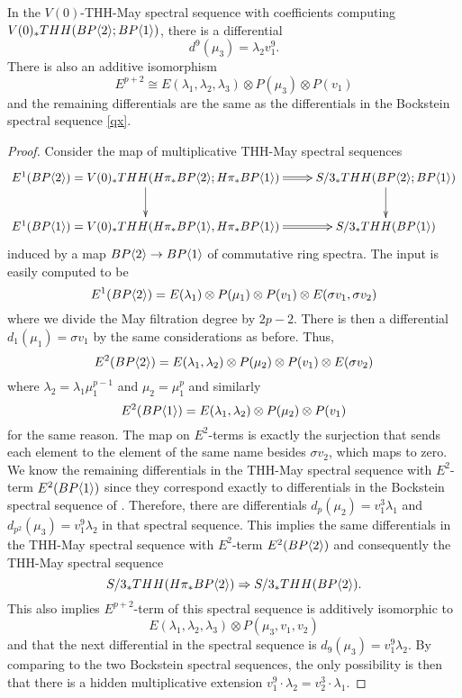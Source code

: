 \begin{lem}
In the $V(0)$-THH-May spectral sequence with coefficients computing $V(0)_*THH(BP\langle 2 \rangle;BP\langle 1 \rangle)$, there is a differential 
\[d^{9}(\mu_3)=\lambda_2v_1^9.\] 
There is also an additive isomorphism 
\[E^{p+2}\cong E(\lambda_1,\lambda_2,\lambda_3)\otimes P(\mu_3)\otimes P(v_1)\]
and the remaining differentials are the same as the differentials in the Bockstein spectral sequence \eqref{qx}.
\end{lem}
\begin{proof}
Consider the map of multiplicative THH-May spectral sequences 
\[ 
\xymatrix{
E^1(\B)=V(0)_*THH(H\pi_*\B;H\pi_*\tBP{1}) \ar[d] \ar@{=>}[r] &  S/3_*THH(\B;\tBP{1}) \ar[d] \\
E^1(\tBP{1})=V(0)_*THH(H\pi_*\tBP{1}, H\pi_*\tBP{1}) \ar@{=>}[r] &  S/3_*THH(\tBP{1})
}
\]
induced by a map $BP\langle 2 \rangle\to BP\langle 1 \rangle$ of commutative ring spectra. 
The input is easily computed to be 
\[ E^1(BP\langle 2 \rangle)=E(\lambda_1)\otimes P(\mu_1)\otimes P(v_1)\otimes E(\sigma v_1,\sigma v_2)\]
where we divide the May filtration degree by $2p-2$. There is then a differential $d_1(\mu_1)=\sigma v_1$ by the same considerations as before. Thus, 
\[ E^2(BP\langle 2 \rangle)=E(\lambda_1,\lambda_2)\otimes P(\mu_2) \otimes P(v_1)\otimes E(\sigma v_2)\]
where $\lambda_2=\lambda_1\mu_1^{p-1}$ and $\mu_2=\mu_1^p$ and similarly
\[ E^2(BP\langle 1 \rangle)=E(\lambda_1,\lambda_2)\otimes P(\mu_2) \otimes P(v_1) \]
for the same reason. 
The map on $E^2$-terms is exactly the surjection that sends each element to the element of the same name besides $\sigma v_2$, which maps to zero. We know the remaining differentials in the THH-May spectral sequence with $E^2$-term $E^2(BP\langle 1 \rangle)$ since they correspond exactly to differentials in the Bockstein spectral sequence of \cite{McClureStaffeldt}. Therefore, there are differentials $d_p(\mu_2)=v_1^3\lambda_1$ and $d_{p^2}(\mu_3)=v_1^{9}\lambda_2$ in that spectral sequence. This implies the same differentials in the THH-May spectral sequence with $E^2$-term $E^2(BP\langle 2 \rangle)$ and consequently the THH-May spectral sequence
\[ S/3_*THH(H\pi_*BP\langle 2 \rangle)\Rightarrow S/3_*THH(BP\langle 2 \rangle).\]
This also implies $E^{p+2}$-term of this spectral sequence is additively isomorphic to 
\[ E(\lambda_1,\lambda_2,\lambda_3)\otimes P(\mu_3,v_1,v_2)\]
and that the next differential in the spectral sequence is $d_{9}(\mu_3)=v_1^9\lambda_2$. By comparing to the two Bockstein spectral sequences, the only possibility is then that there is a hidden multiplicative extension $v_1^9\cdot \lambda_2=v_2^3\cdot \lambda_1$. 
\end{proof}
\begin{comment}
\begin{conj}
In the $V(0)$-THH-May spectral sequence there is another hidden multiplicative extension $v_1^{p^3}\lambda_3\cdot{=|v_2^{p^{2}}\lambda_{2}$. 
\end{conj}
\end{comment}
